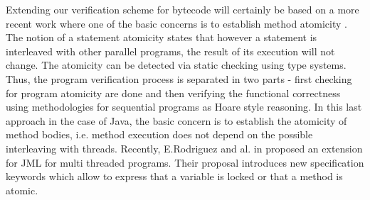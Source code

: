 Extending our verification scheme for bytecode will certainly be based on a more recent work  where one of the basic concerns is to establish method atomicity  \cite{TES03CF}. 
The notion of a statement atomicity states  that however a statement is interleaved with other parallel programs, the result of its execution will not change.
The atomicity can be  detected via static checking \cite{TES03CF} using type systems. Thus, the program verification process is separated in two parts
- first checking for program atomicity  \cite{TES03CF} are done  
and then verifying the functional correctness using  methodologies for sequential programs as Hoare style reasoning. 
In this last approach in the case of Java, the basic concern is to establish the atomicity of method bodies, i.e. method 
execution does not depend on the possible interleaving with threads.
Recently, E.Rodriguez and al. in \cite{RodriguezDFHLR05} proposed an extension for JML for multi threaded
 programs. Their proposal introduces  new specification keywords which allow to express that a variable is locked or
 that a method is atomic.%
    
